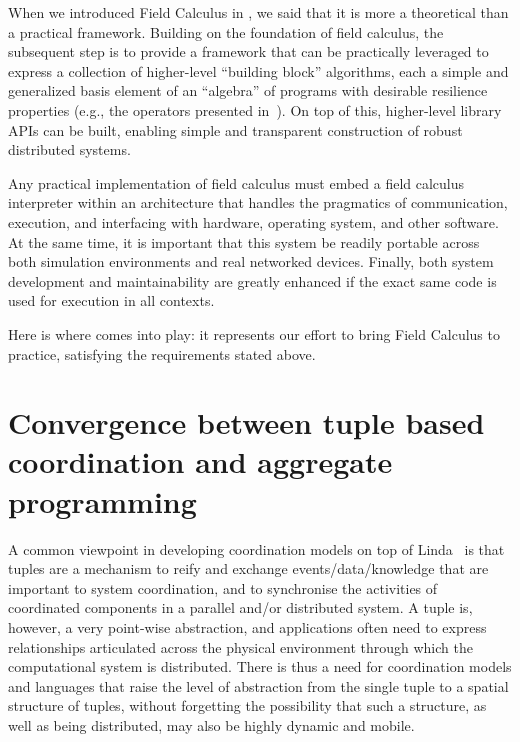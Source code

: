 \documentclass[12pt,a4paper,twoside,openright]{book}
\begin{document}



When we introduced Field Calculus in , we said that it is more a theoretical than a practical framework.
%
Building on the foundation of field calculus, the subsequent step is to provide a framework that can be practically leveraged to express a collection of higher-level ``building block'' algorithms, each a simple and generalized basis element of an ``algebra'' of programs with desirable resilience properties (e.g., the operators presented in~\cite{BV-FOCAS2014}).
%
On top of this, higher-level library APIs can be built, enabling simple and transparent construction of robust distributed systems.

Any practical implementation of field calculus must embed a field calculus interpreter within an architecture that handles the pragmatics of communication, execution, and interfacing with hardware, operating system, and other software.
%
At the same time, it is important that this system be readily portable across both simulation environments and real networked devices.
%
Finally, both system development and maintainability are greatly enhanced if the exact same code is used for execution in all contexts.

Here is where \protelis{} comes into play: it represents our effort to bring Field Calculus to practice, satisfying the requirements stated above.


\section{Convergence between tuple based coordination and aggregate programming}

A common viewpoint in developing coordination models on top of Linda~\cite{linda-toplas7} is that tuples are a mechanism to reify and exchange events/data/knowledge that are important to system coordination, and to synchronise the activities of coordinated components in a parallel and/or distributed system.
%
A tuple is, however, a very point-wise abstraction, and applications often need to express relationships articulated across the physical environment through which the computational system is distributed.
%
There is thus a need for coordination models and languages that raise the level of abstraction from the single tuple to a spatial structure of tuples, without forgetting the possibility that such a structure, as well as being distributed, may also be highly dynamic and mobile.
\end{document}
